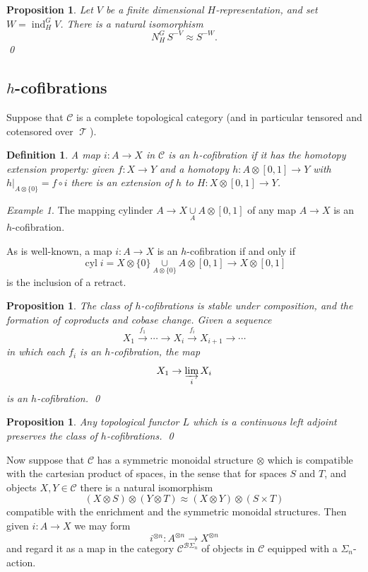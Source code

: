 \documentclass{amsart}
\newtheorem{prop}[equation]{Proposition}
\newtheorem{definition}[equation]{Definition}
\newenvironment{defin}{\begin{definition}\rm}{\end{definition}}
\theoremstyle{definition}
\newtheorem{defin}[equation]{Definition}
\theoremstyle{remark}
\newtheorem{eg}[equation]{Example}
\DeclareMathOperator{\spaces}{\mathcal T}
\newcommand{\norm}{N}
\DeclareMathOperator{\ind}{ind}
\newcommand{\cat}[1]{{\mathcal #1}}
\DeclareMathOperator{\cyl}{cyl}
\begin{document}
\begin{prop}
\label{thm:12} Let $V$ be a finite dimensional $H$-representation, and
set $W=\ind_{H}^{G}V$.  There is a natural isomorphism
\[
\norm_{H}^{G}\,S^{-V} \approx S^{-W}.
\]
\qed
\end{prop}

\subsection{$h$-cofibrations}
\label{sec:h-cofibrations}
Suppose that $\cat C$ is a complete topological category (and in
particular tensored and cotensored over $\spaces$).

\begin{defin}
\label{def:49}
A map $i:A\to X$ in $\cat C$ is an {\em $h$-cofibration} if it has the
homotopy extension property:  given $f:X\to Y$ and a homotopy
$h:A\otimes [0,1]\to Y$ with $h\vert_{A\otimes\{0 \}}=f\circ i$ there
is an extension of $h$ to $H:X\otimes[0,1]\to Y$.
\end{defin}

\begin{eg}
The mapping cylinder $A\to X \underset{A}{\cup}A\otimes [0,1]$ of
any map $A\to X$ is an $h$-cofibration.
\end{eg}


As is well-known, a map $i:A\to X$ is an $h$-cofibration if and only if
\[
\cyl i = X\otimes\{0 \}\underset{A\otimes\{0 \}}{\cup}A\otimes[0,1]
\to X\otimes [0,1]
\]
is the inclusion of a retract.


\begin{prop}
\label{thm:211} The class of $h$-cofibrations is stable under
composition, and the formation of coproducts and cobase change.  Given
a sequence 
\[
X_{1}\xrightarrow{f_{1}}{} \cdots\to X_{i}\xrightarrow{f_{i}}X_{i+1}\to\cdots
\]
in which each $f_{i}$ is an $h$-cofibration, the map 
\[
X_{1}\to \varinjlim_{i}X_{i}
\]
is an $h$-cofibration.  \qed
\end{prop}

\begin{prop}
\label{thm:216}
Any topological functor $L$ which is a continuous left adjoint
preserves the class of $h$-cofibrations.  \qed
\end{prop}


Now suppose that $\cat C$ has a symmetric monoidal structure $\otimes$
which is compatible with the cartesian product of spaces, in the sense
that for spaces $S$ and $T$, and objects $X,Y\in\cat C$ there is a natural isomorphism
\[
(X\otimes S)\otimes (Y\otimes T) \approx (X\otimes Y)\otimes (S\times T)
\]
compatible with the enrichment and the symmetric monoidal structures.
Then given $i:A\to X$ we may form
\[
i^{\otimes n}:A^{\otimes n}\to X^{\otimes n}
\]
and regard it as a map in the category $\cat C^{\cat B{\Sigma_{n}}}$
of objects in $\cat C$ equipped with a $\Sigma_{n}$-action.
\end{document}
